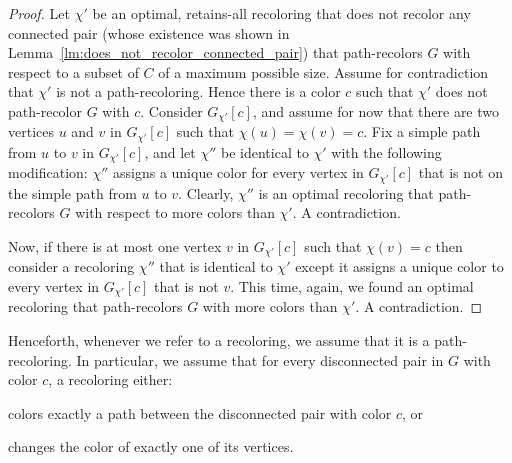 \begin{proof}
Let $\chi'$ be an optimal, 
retains-all recoloring that does not recolor any connected pair 
(whose existence was shown in Lemma~\ref{lm:does_not_recolor_connected_pair}) 
that path-recolors $G$ with respect to a subset of $C$ of a maximum possible size. 
%
Assume for contradiction that $\chi'$ is not a path-recoloring.  
%
Hence there is a color $c$ such that $\chi'$ does not path-recolor $G$ with $c$.
%
Consider $G_{\chi'}[c]$, 
and assume for now that there are two vertices $u$
and $v$ in $G_{\chi'}[c]$ such that $\chi(u) = \chi(v) = c$.  
%
Fix a simple path from $u$ to $v$ in $G_{\chi'}[c]$, 
and let $\chi''$ be identical to $\chi'$ with the following modification: 
$\chi''$ assigns a unique color for every vertex in $G_{\chi'}[c]$ 
that is not on the simple path from $u$ to $v$.
%
Clearly, 
$\chi''$ is an optimal recoloring that path-recolors 
$G$ with respect to more colors than $\chi'$.  
%
A contradiction.
	
Now,
if there is at most one vertex $v$ in $G_{\chi'}[c]$ such that $\chi(v) = c$ 
then consider a recoloring $\chi''$ that is identical to $\chi'$ 
except it assigns a unique color to every vertex in $G_{\chi'}[c]$ that is not $v$.
%
This time, 
again, 
we found an optimal recoloring that path-recolors $G$ with more colors than $\chi'$.  
%
A contradiction.
{}\end{proof}

Henceforth, 
whenever we refer to a recoloring, 
we assume that it is a path-recoloring.
In particular, 
we assume that for every disconnected pair in $G$ with color $c$, 
a recoloring either:
\begin{inparaenum}[(i)]
	\item colors exactly a path between the disconnected pair with color $c$, or
	\item changes the color of exactly one of its vertices. 
\end{inparaenum}